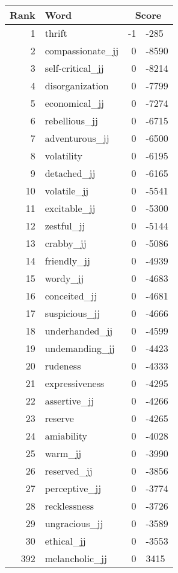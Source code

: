 \begin{longtable}[!htbp]{| rlr@{.}l |}
    \hline
    \textbf{Rank} & \textbf{Word} & \multicolumn{2}{c|}{\textbf{Score}} \\
    \hline
    \endhead
    1 & thrift & -1 & -285 \\
    2 & compassionate\_jj & 0 & -8590 \\
    3 & self-critical\_jj & 0 & -8214 \\
    4 & disorganization & 0 & -7799 \\
    5 & economical\_jj & 0 & -7274 \\
    6 & rebellious\_jj & 0 & -6715 \\
    7 & adventurous\_jj & 0 & -6500 \\
    8 & volatility & 0 & -6195 \\
    9 & detached\_jj & 0 & -6165 \\
    10 & volatile\_jj & 0 & -5541 \\
    11 & excitable\_jj & 0 & -5300 \\
    12 & zestful\_jj & 0 & -5144 \\
    13 & crabby\_jj & 0 & -5086 \\
    14 & friendly\_jj & 0 & -4939 \\
    15 & wordy\_jj & 0 & -4683 \\
    16 & conceited\_jj & 0 & -4681 \\
    17 & suspicious\_jj & 0 & -4666 \\
    18 & underhanded\_jj & 0 & -4599 \\
    19 & undemanding\_jj & 0 & -4423 \\
    20 & rudeness & 0 & -4333 \\
    21 & expressiveness & 0 & -4295 \\
    22 & assertive\_jj & 0 & -4266 \\
    23 & reserve & 0 & -4265 \\
    24 & amiability & 0 & -4028 \\
    25 & warm\_jj & 0 & -3990 \\
    26 & reserved\_jj & 0 & -3856 \\
    27 & perceptive\_jj & 0 & -3774 \\
    28 & recklessness & 0 & -3726 \\
    29 & ungracious\_jj & 0 & -3589 \\
    30 & ethical\_jj & 0 & -3553 \\
    392 & melancholic\_jj & 0 & 3415 \\

\end{longtable}
